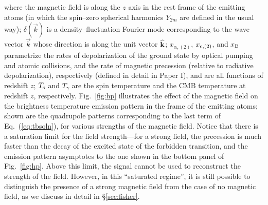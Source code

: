 \documentclass[aps,prd,twocolumn,floatfix,showpacs,superscriptaddress,nofootinbib]{revtex4-1}
\newcommand{\eq}[1]{{Eq.~(#1)}}
\begin{document}
where the magnetic field is along the $z$ axis in the rest frame of the emitting atoms (in which the spin--zero spherical harmonics $Y_{2 m}$ are defined in the usual way); $\delta(\vec k)$ is a density--fluctuation Fourier mode corresponding to the wave vector $\vec k$ whose direction is along the unit vector $\bf{\widehat k}$; $x_{\alpha, (2)}$, $x_{{\rm c}, (2)}$, and $x_{\rm B}$ parametrize the rates of depolarization of the ground state by optical pumping and atomic collisions, and the rate of magnetic precession (relative to radiative depolarization), respectively (defined in detail in Paper I), and are all functions of redshift $z$; $T_{\rm s}$ and $T_\gamma$ are the spin temperature and the CMB temperature at redshift $z$, respectively. Fig.~\ref{fig:hp} illustrates the effect of the magnetic field on the brightness temperature emission pattern in the frame of the emitting atoms; shown are the quadrupole patterns corresponding to the last term of \eq{\ref{eq:tbsoln}}, for various strengths of the magnetic field. Notice that there is a saturation limit for the field strength---for a strong field, the precession is much faster than the decay of the excited state of the forbidden transition, and the emission pattern asymptotes to the one shown in the bottom panel of Fig.~\ref{fig:hp}. Above this limit, the signal cannot be used to reconstruct the strength of the field. However, in this ``saturated regime'', it is still possible to distinguish the presence of a strong magnetic field from the case of no magnetic field, as we discuss in detail in \S\ref{sec:fisher}.
\end{document}
